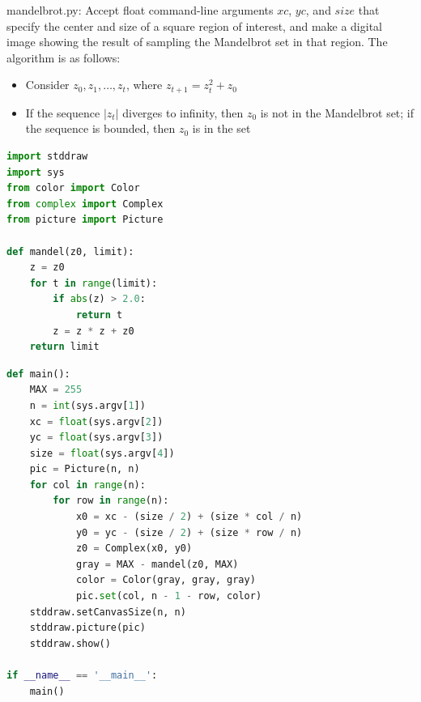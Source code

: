 \documentclass[8pt,a4paper,compress]{beamer}
\begin{document}
\begin{frame}[fragile]
\pause

\begin{framed}
\tiny mandelbrot.py: Accept float command-line arguments $xc$, $yc$, and $size$ that specify the center and size of a square region of interest, and make a digital image showing the result of sampling the Mandelbrot set in that region. The algorithm is as follows:
\begin{itemize}
\item Consider $z_0, z_1, \dots, z_t$, where $z_{t+1}=z_t^2+z_0$
\item If the sequence $|z_t|$ diverges to infinity, then $z_0$ is not in the Mandelbrot set; if the sequence is bounded, then $z_0$ is in the set
\end{itemize}
\end{framed}

\begin{lstlisting}[language=Python]
import stddraw
import sys
from color import Color
from complex import Complex
from picture import Picture

def mandel(z0, limit):
    z = z0
    for t in range(limit):
        if abs(z) > 2.0:
            return t
        z = z * z + z0
    return limit
\end{lstlisting}
\end{frame}

\begin{frame}[fragile]
\pause

\begin{lstlisting}[language=Python]
def main():
    MAX = 255
    n = int(sys.argv[1])
    xc = float(sys.argv[2])
    yc = float(sys.argv[3])
    size = float(sys.argv[4])
    pic = Picture(n, n)
    for col in range(n):
        for row in range(n):
            x0 = xc - (size / 2) + (size * col / n)
            y0 = yc - (size / 2) + (size * row / n)
            z0 = Complex(x0, y0)
            gray = MAX - mandel(z0, MAX)
            color = Color(gray, gray, gray)
            pic.set(col, n - 1 - row, color)
    stddraw.setCanvasSize(n, n)
    stddraw.picture(pic)
    stddraw.show()

if __name__ == '__main__':
    main()
\end{lstlisting}
\end{frame}
\end{document}
